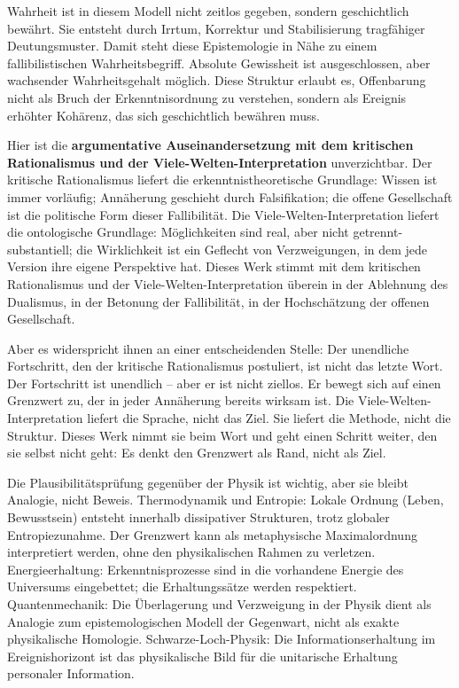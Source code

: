 \documentclass[
  ngerman,
]{article}
\begin{document}
Wahrheit ist in diesem Modell nicht zeitlos gegeben, sondern
geschichtlich bewährt. Sie entsteht durch Irrtum, Korrektur und
Stabilisierung tragfähiger Deutungsmuster. Damit steht diese
Epistemologie in Nähe zu einem fallibilistischen Wahrheitsbegriff.
Absolute Gewissheit ist ausgeschlossen, aber wachsender Wahrheitsgehalt
möglich. Diese Struktur erlaubt es, Offenbarung nicht als Bruch der
Erkenntnisordnung zu verstehen, sondern als Ereignis erhöhter Kohärenz,
das sich geschichtlich bewähren muss.

Hier ist die \textbf{argumentative Auseinandersetzung mit dem kritischen
Rationalismus und der Viele-Welten-Interpretation} unverzichtbar. Der
kritische Rationalismus liefert die erkenntnistheoretische Grundlage:
Wissen ist immer vorläufig; Annäherung geschieht durch Falsifikation;
die offene Gesellschaft ist die politische Form dieser Fallibilität. Die
Viele-Welten-Interpretation liefert die ontologische Grundlage:
Möglichkeiten sind real, aber nicht getrennt-substantiell; die
Wirklichkeit ist ein Geflecht von Verzweigungen, in dem jede Version
ihre eigene Perspektive hat. Dieses Werk stimmt mit dem kritischen
Rationalismus und der Viele-Welten-Interpretation überein in der
Ablehnung des Dualismus, in der Betonung der Fallibilität, in der
Hochschätzung der offenen Gesellschaft.

Aber es widerspricht ihnen an einer entscheidenden Stelle: Der
unendliche Fortschritt, den der kritische Rationalismus postuliert, ist
nicht das letzte Wort. Der Fortschritt ist unendlich -- aber er ist
nicht ziellos. Er bewegt sich auf einen Grenzwert zu, der in jeder
Annäherung bereits wirksam ist. Die Viele-Welten-Interpretation liefert
die Sprache, nicht das Ziel. Sie liefert die Methode, nicht die
Struktur. Dieses Werk nimmt sie beim Wort und geht einen Schritt weiter,
den sie selbst nicht geht: Es denkt den Grenzwert als Rand, nicht als
Ziel.

Die Plausibilitätsprüfung gegenüber der Physik ist wichtig, aber sie
bleibt Analogie, nicht Beweis. Thermodynamik und Entropie: Lokale
Ordnung (Leben, Bewusstsein) entsteht innerhalb dissipativer Strukturen,
trotz globaler Entropiezunahme. Der Grenzwert kann als metaphysische
Maximalordnung interpretiert werden, ohne den physikalischen Rahmen zu
verletzen. Energieerhaltung: Erkenntnisprozesse sind in die vorhandene
Energie des Universums eingebettet; die Erhaltungssätze werden
respektiert. Quantenmechanik: Die Überlagerung und Verzweigung in der
Physik dient als Analogie zum epistemologischen Modell der Gegenwart,
nicht als exakte physikalische Homologie. Schwarze-Loch-Physik: Die
Informationserhaltung im Ereignishorizont ist das physikalische Bild für
die unitarische Erhaltung personaler Information.
\end{document}
